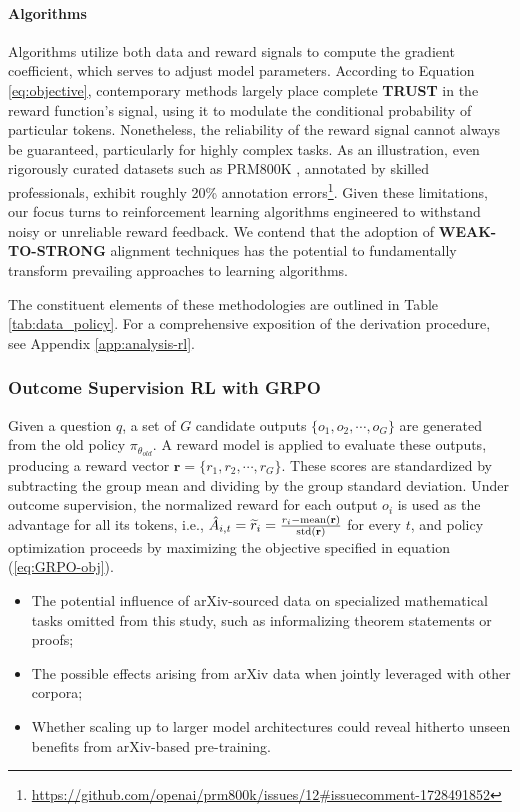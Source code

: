 \paragraph{Algorithms} Algorithms utilize both data and reward signals to compute the gradient coefficient, which serves to adjust model parameters. According to Equation \ref{eq:objective}, contemporary methods largely place complete \textbf{TRUST} in the reward function's signal, using it to modulate the conditional probability of particular tokens. Nonetheless, the reliability of the reward signal cannot always be guaranteed, particularly for highly complex tasks. As an illustration, even rigorously curated datasets such as PRM800K \citep{lightman2023let}, annotated by skilled professionals, exhibit roughly 20\% annotation errors\footnote{\url{https://github.com/openai/prm800k/issues/12\#issuecomment-1728491852}}. Given these limitations, our focus turns to reinforcement learning algorithms engineered to withstand noisy or unreliable reward feedback. We contend that the adoption of \textbf{WEAK-TO-STRONG} \citep{burns2023weak} alignment techniques has the potential to fundamentally transform prevailing approaches to learning algorithms.

The constituent elements of these methodologies are outlined in Table \ref{tab:data_policy}. For a comprehensive exposition of the derivation procedure, see Appendix \ref{app:analysis-rl}.

\subsubsection{Outcome Supervision RL with GRPO} Given a question $q$, a set of $G$ candidate outputs $\{o_1, o_2, \cdots, o_G\}$ are generated from the old policy $\pi_{\theta_{old}}$. A reward model is applied to evaluate these outputs, producing a reward vector $\mathbf{r} = \{r_1, r_2, \cdots, r_G\}$. These scores are standardized by subtracting the group mean and dividing by the group standard deviation. Under outcome supervision, the normalized reward for each output $o_i$ is used as the advantage for all its tokens, i.e., $\hat{A}_{i, t} = \widetilde{r}_i = \frac{r_i- {\rm mean}(\mathbf{r})}{{\rm std}(\mathbf{r})}$ for every $t$, and policy optimization proceeds by maximizing the objective specified in equation (\ref{eq:GRPO-obj}).

\begin{itemize}[topsep=0pt]
    \item The potential influence of arXiv-sourced data on specialized mathematical tasks omitted from this study, such as informalizing theorem statements or proofs;
    \item The possible effects arising from arXiv data when jointly leveraged with other corpora;
    \item Whether scaling up to larger model architectures could reveal hitherto unseen benefits from arXiv-based pre-training.
\end{itemize}

